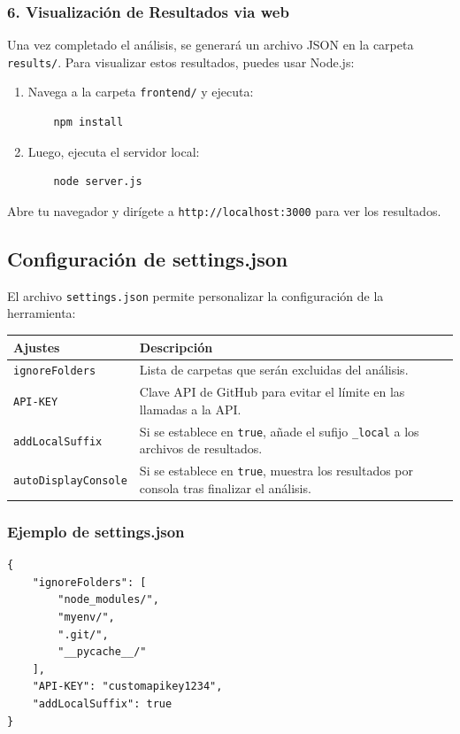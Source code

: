 \documentclass[a4paper, 12pt]{book}
\begin{document}
\subsubsection{6. Visualización de Resultados via web}
Una vez completado el análisis, se generará un archivo JSON en la carpeta \texttt{results/}. Para visualizar estos resultados, puedes usar Node.js:
\begin{enumerate}
    \item Navega a la carpeta \texttt{frontend/} y ejecuta:
    \begin{verbatim}
    npm install
    \end{verbatim}
    \item Luego, ejecuta el servidor local:
    \begin{verbatim}
    node server.js
    \end{verbatim}
\end{enumerate}
Abre tu navegador y dirígete a \texttt{http://localhost:3000} para ver los resultados.

\subsection{Configuración de settings.json}
El archivo \texttt{settings.json} permite personalizar la configuración de la herramienta:
\vspace{1em}

\begin{tabular}{|l|p{10cm}|} %
\hline
\textbf{Ajustes} & \textbf{Descripción} \\
\hline
\texttt{ignoreFolders} & Lista de carpetas que serán excluidas del análisis. \\
\texttt{API-KEY} & Clave API de GitHub para evitar el límite en las llamadas a la API. \\
\texttt{addLocalSuffix} & Si se establece en \texttt{true}, añade el sufijo \texttt{\_local} a los archivos de resultados. \\
\texttt{autoDisplayConsole} & Si se establece en \texttt{true}, muestra los resultados por consola tras finalizar el análisis. \\
\hline
\end{tabular}

\vspace{1em}
\subsubsection{Ejemplo de settings.json}
\begin{verbatim}
{
    "ignoreFolders": [
        "node_modules/",
        "myenv/",
        ".git/",
        "__pycache__/"
    ],
    "API-KEY": "customapikey1234",
    "addLocalSuffix": true
}
\end{verbatim}
\end{document}
